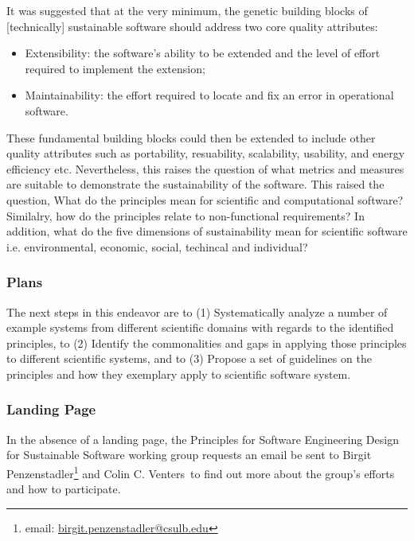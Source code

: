 It was suggested that at the very minimum, the genetic building blocks of [technically] sustainable software should address two core quality attributes:
\begin{itemize}
\item Extensibility: the software’s ability to be extended and the level of effort required to implement the extension;
\item Maintainability: the effort required to locate and fix an error in operational software.
\end{itemize}
These fundamental building blocks could then be extended to include other quality attributes such as portability, resuability, scalability, usability, and energy efficiency etc. Nevertheless, this raises the question of what metrics and measures are suitable to demonstrate the sustainability of the software. This raised the question, What do the principles mean for scientific and computational software? Similalry, how do the principles relate to non-functional requirements? In addition, what do the five dimensions of sustainability mean for scientific software i.e. environmental, economic, social, techincal and individual?

\subsubsection{Plans}
The next steps in this endeavor are to (1) Systematically analyze a number of example systems from different scientific domains with regards to the identified principles, to (2) Identify the commonalities and gaps in applying those principles to different scientific systems, and to (3) Propose a set of guidelines on the principles and how they exemplary apply to scientific software system. 

\subsubsection{Landing Page}
In the absence of a landing page, the Principles for Software Engineering Design for Sustainable Software working group requests an email be sent to Birgit Penzenstadler\footnote{email: \href{mailto:birgit.penzenstadler@csulb.edu}{birgit.penzenstadler@csulb.edu}} and Colin C. Venters\ to find out more about the group's efforts and how to participate.
